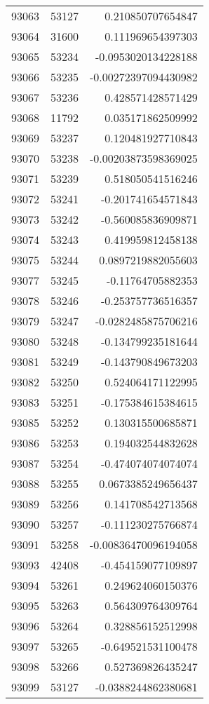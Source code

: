 \begin{tabular}{r | r | r}
93063 & 53127 & 0.210850707654847 \\
93064 & 31600 & 0.111969654397303 \\
93065 & 53234 & -0.0953020134228188 \\
93066 & 53235 & -0.00272397094430982 \\
93067 & 53236 & 0.428571428571429 \\
93068 & 11792 & 0.035171862509992 \\
93069 & 53237 & 0.120481927710843 \\
93070 & 53238 & -0.00203873598369025 \\
93071 & 53239 & 0.518050541516246 \\
93072 & 53241 & -0.201741654571843 \\
93073 & 53242 & -0.560085836909871 \\
93074 & 53243 & 0.419959812458138 \\
93075 & 53244 & 0.0897219882055603 \\
93077 & 53245 & -0.11764705882353 \\
93078 & 53246 & -0.253757736516357 \\
93079 & 53247 & -0.0282485875706216 \\
93080 & 53248 & -0.134799235181644 \\
93081 & 53249 & -0.143790849673203 \\
93082 & 53250 & 0.524064171122995 \\
93083 & 53251 & -0.175384615384615 \\
93085 & 53252 & 0.130315500685871 \\
93086 & 53253 & 0.194032544832628 \\
93087 & 53254 & -0.474074074074074 \\
93088 & 53255 & 0.0673385249656437 \\
93089 & 53256 & 0.141708542713568 \\
93090 & 53257 & -0.111230275766874 \\
93091 & 53258 & -0.00836470096194058 \\
93093 & 42408 & -0.454159077109897 \\
93094 & 53261 & 0.249624060150376 \\
93095 & 53263 & 0.564309764309764 \\
93096 & 53264 & 0.328856152512998 \\
93097 & 53265 & -0.649521531100478 \\
93098 & 53266 & 0.527369826435247 \\
93099 & 53127 & -0.0388244862380681 \\

\end{tabular}
